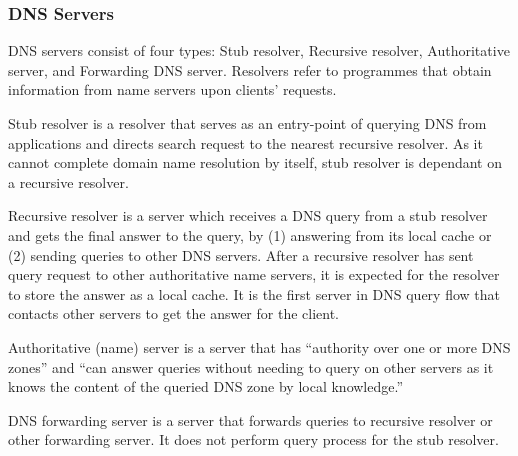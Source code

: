\documentclass[a4paper,12pt]{article}
\begin{document}
\subsubsection{DNS Servers}\label{dnsservers}
DNS servers consist of four types: Stub resolver, Recursive resolver, Authoritative server, and Forwarding DNS server. Resolvers refer to programmes that obtain information from name servers upon clients' requests\cite{rfc1034}.

Stub resolver is a resolver that serves as an entry-point of querying DNS from applications and directs search request to the nearest recursive resolver\cite{rfc1123}. As it cannot complete domain name resolution by itself, stub resolver is dependant on a recursive resolver\cite{rfc8499}.

Recursive resolver is a server which receives a DNS query from a stub resolver and gets the final answer to the query, by (1) answering from its local cache or (2) sending queries to other DNS servers\cite{rfc8499}. After a recursive resolver has sent query request to other authoritative name servers, it is expected for the resolver to store the answer as a local cache. It is the first server in DNS query flow that contacts other servers to get the answer for the client. 

Authoritative (name) server is a server that has ``authority over one or more DNS zones\cite{rfc8499}'' and ``can answer queries without needing to query on other servers as it knows the content of the queried DNS zone by local knowledge\cite{rfc2182}.''

DNS forwarding server is a server that forwards queries to recursive resolver or other forwarding server. It does not perform query process for the stub resolver.
\end{document}

